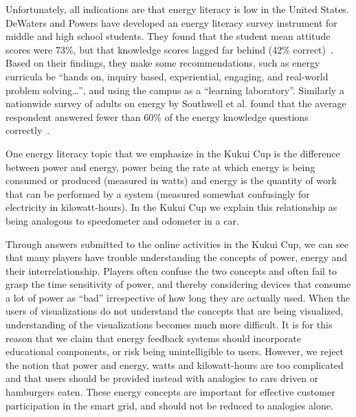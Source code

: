 \documentclass[10pt, conference, compsocconf]{IEEEtran}
\begin{document}
Unfortunately, all indications are that energy literacy is low in the United States. DeWaters and Powers have developed an energy literacy survey instrument for middle and high school students. They found that the student mean attitude scores were 73\%, but that knowledge scores lagged far behind (42\% correct)~\cite{DeWaters2011}. Based on their findings, they make some recommendations, such as energy curricula be ``hands on, inquiry based, experiential, engaging, and real-world problem solving\ldots'', and using the campus as a ``learning laboratory''. Similarly a nationwide survey of adults on energy by Southwell et al. found that the average respondent answered fewer than 60\% of the energy knowledge questions correctly~\cite{Southwell2012}.

One energy literacy topic that we emphasize in the Kukui Cup is the difference between power and energy, power being the rate at which energy is being consumed or produced (measured in watts) and energy is the quantity of work that can be performed by a system (measured somewhat confusingly for electricity in kilowatt-hours). In the Kukui Cup we explain this relationship as being analogous to speedometer and odometer in a car.

Through answers submitted to the online activities in the Kukui Cup, we can see that many players have trouble understanding the concepts of power, energy and their interrelationship. Players often confuse the two concepts and often fail to grasp the time sensitivity of power, and thereby considering devices that consume a lot of power as ``bad'' irrespective of how long they are actually used. When the users of visualizations do not understand the concepts that are being visualized, understanding of the visualizations becomes much more difficult. It is for this reason that we claim that energy feedback systems should incorporate educational components, or risk being unintelligible to users. However, we reject the notion that power and energy, watts and kilowatt-hours are too complicated and that users should be provided instead with analogies to cars driven or hamburgers eaten. These energy concepts are important for effective customer participation in the smart grid, and should not be reduced to analogies alone.

\end{document}
